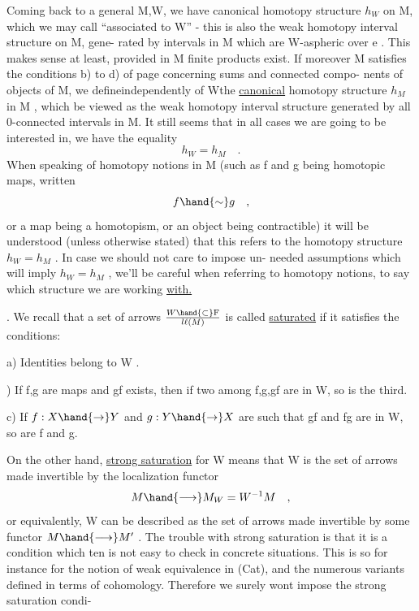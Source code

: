 
Coming back to a general M,W, we have  
canonical homotopy structure $h_W$ on M, which we may call ``associated to
W'' - this is also the weak homotopy interval structure on M, gene-%
rated by intervals in M which are W-aspheric over e . This makes sense
at least, provided in M finite products exist. If moreover M satisfies
the conditions b) to d) of page  concerning sums and connected compo-%
nents of objects of M, we  define\hand{(}independently of W\hand{)}the \uline{canonical}
homotopy structure $h_M$ in M , which  be viewed as the weak homotopy
interval structure generated by all 0-connected intervals in M. It still
seems that in all cases we are going to be interested in, we have the
equality
\[ h_W = h_M \quad . \]
When speaking of homotopy notions in M (such as f and g being homotopic
maps, written
\[ f \hand{\sim} g \quad , \]
or a map being a homotopism, or an object being contractible) it will be
understood  (unless otherwise stated) that this refers to the
homotopy structure $h_W = h_M$ . In case we should not care to impose  un-%
needed assumptions which will imply $h_W = h_M$ , we'll be careful when
referring to homotopy notions, to say which structure we are working
\uline{with.}
\margin{\rule{.9\linewidth}{.35pt}}

. We recall that a set of arrows $W \hand{\subset} \mathrm{F}\over{l}{\ell}(M)$ is called \uline{saturated} if it
satisfies the conditions:

a) Identities belong to W .

) If f,g are maps and gf exists, then if two among f,g,gf are in
W, so is the third.

c) If $f:X \hand{\to} Y$ and $g: Y \hand{\to} X$ are such that gf and fg are in W, so are
f and g.

 On the other hand, \uline{strong saturation} for W means that W is
the set of arrows made invertible by the localization functor
\[ M \hand{\longrightarrow} M_W = W^{-1}M \quad , \]
 or equivalently,  W can be described as the set of
arrows made invertible by some functor $M \hand{\longrightarrow} M'$ . The trouble with strong
saturation is that it is a condition which ten is not easy to check
in concrete situations. This is so for instance for the notion of weak
equivalence in (Cat), and the numerous variants defined in terms of
cohomology. Therefore we surely wont impose the strong saturation condi-%

